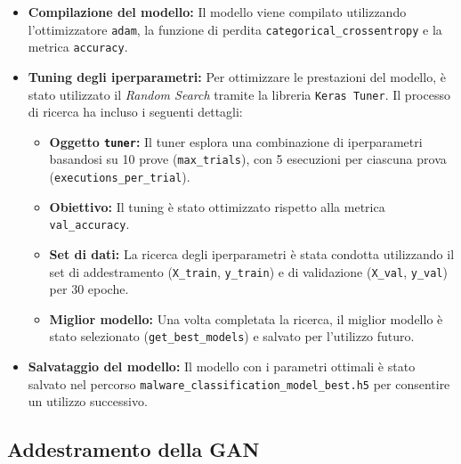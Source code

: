 \begin{itemize}
    \item \textbf{Compilazione del modello:} 
    Il modello viene compilato utilizzando l'ottimizzatore \texttt{adam}, la funzione di perdita \texttt{categorical\_crossentropy} e la metrica \texttt{accuracy}.

    \item \textbf{Tuning degli iperparametri:} 
    Per ottimizzare le prestazioni del modello, è stato utilizzato il \textit{Random Search} tramite la libreria \texttt{Keras Tuner}. Il processo di ricerca ha incluso i seguenti dettagli:
    \begin{itemize}
        \item \textbf{Oggetto \texttt{tuner}:} Il tuner esplora una combinazione di iperparametri basandosi su 10 prove (\texttt{max\_trials}), con 5 esecuzioni per ciascuna prova (\texttt{executions\_per\_trial}).
        \item \textbf{Obiettivo:} Il tuning è stato ottimizzato rispetto alla metrica \texttt{val\_accuracy}.
        \item \textbf{Set di dati:} La ricerca degli iperparametri è stata condotta utilizzando il set di addestramento (\texttt{X\_train}, \texttt{y\_train}) e di validazione (\texttt{X\_val}, \texttt{y\_val}) per 30 epoche.
        \item \textbf{Miglior modello:} Una volta completata la ricerca, il miglior modello è stato selezionato (\texttt{get\_best\_models}) e salvato per l'utilizzo futuro.
    \end{itemize}

    \item \textbf{Salvataggio del modello:} 
    Il modello con i parametri ottimali è stato salvato nel percorso \texttt{malware\_classification\_model\_best.h5} per consentire un utilizzo successivo.
\end{itemize}


\subsection{Addestramento della GAN}
